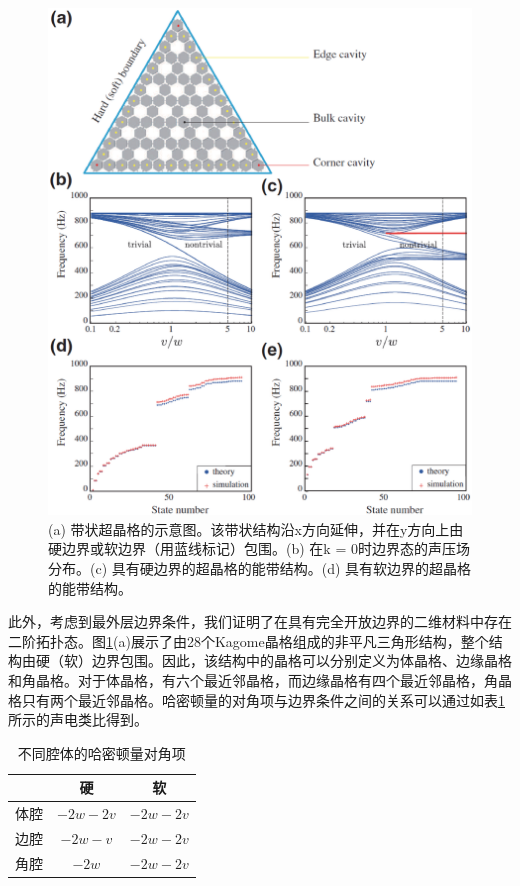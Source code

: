 \begin{figure}[h!]
  \centering
  \includegraphics[width=1\textwidth]{images/fig3-11.eps} 
  \caption{(a) 带状超晶格的示意图。该带状结构沿x方向延伸，并在y方向上由硬边界或软边界（用蓝线标记）包围。(b) 在k = 0时边界态的声压场分布。(c) 具有硬边界的超晶格的能带结构。(d) 具有软边界的超晶格的能带结构。}
  \label{fig_3_11}
\end{figure}


此外，考虑到最外层边界条件，我们证明了在具有完全开放边界的二维材料中存在二阶拓扑态。图\ref{fig_3_11}(a)展示了由28个Kagome晶格组成的非平凡三角形结构，整个结构由硬（软）边界包围。因此，该结构中的晶格可以分别定义为体晶格、边缘晶格和角晶格。对于体晶格，有六个最近邻晶格，而边缘晶格有四个最近邻晶格，角晶格只有两个最近邻晶格。哈密顿量的对角项与边界条件之间的关系可以通过如表\ref{table-1}所示的声电类比得到。

\begin{table}[h]
  \centering
  \caption{不同腔体的哈密顿量对角项}
  \label{table-1}
  \begin{tabular}{ccc}
  \hline
   & 硬 & 软 \\
  \hline
  体腔 & $-2w - 2v$ & $-2w - 2v$ \\
  边腔 & $-2w - v$ & $-2w - 2v$ \\
  角腔 & $-2w$ & $-2w - 2v$ \\
  \hline
  \end{tabular}
  \end{table}

